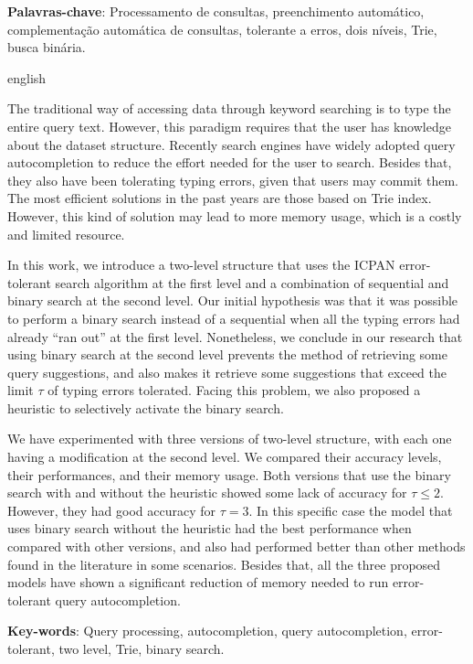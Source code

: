 \documentclass[
	12pt,				%
	openright,			%
	twoside,			%
	a4paper,			%
	english,			%
	spanish,			%
	brazil,				%
	]{abntex2}
\begin{document}
\begin{resumo}
\vspace{\onelineskip}
\noindent
\textbf{Palavras-chave}: Processamento de consultas, preenchimento automático, complementação automática de consultas, tolerante a erros, dois níveis, Trie, busca binária.
 

\end{resumo}

\begin{resumo}[Abstract]
 \begin{otherlanguage*}{english}

The traditional way of accessing data through keyword searching is to type the entire query text. However, this paradigm requires that the user has knowledge about the dataset structure. Recently search engines have widely adopted query autocompletion to reduce the effort needed for the user to search. Besides that, they also have been tolerating typing errors, given that users may commit them. The most efficient solutions in the past years are those based on Trie index. However, this kind of solution may lead to more memory usage, which is a costly and limited resource.

In this work, we introduce a two-level structure that uses the ICPAN error-tolerant search algorithm at the first level and a combination of sequential and binary search at the second level. Our initial hypothesis was that it was possible to perform a binary search instead of a sequential when all the typing errors had already ``ran out'' at the first level. Nonetheless, we conclude in our research that using binary search at the second level prevents the method of retrieving some query suggestions, and also makes it retrieve some suggestions that exceed the limit $\tau$ of typing errors tolerated. Facing this problem, we also proposed a heuristic to selectively activate the binary search.

We have experimented with three versions of two-level structure, with each one having a modification at the second level. We compared their accuracy levels, their performances, and their memory usage. Both versions that use the binary search with and without the heuristic showed some lack of accuracy for $\tau \leq 2$. However, they had good accuracy for $\tau=3$. In this specific case the model that uses binary search without the heuristic had the best performance when compared with other versions, and also had performed better than other methods found in the literature in some scenarios. Besides that, all the three proposed models have shown a significant reduction of memory needed to run error-tolerant query autocompletion.


  \vspace{\onelineskip}
 
  \noindent 
  \textbf{Key-words}: Query processing, autocompletion, query autocompletion, error-tolerant, two level, Trie, binary search.
 \end{otherlanguage*}
\end{resumo}
\end{document}
